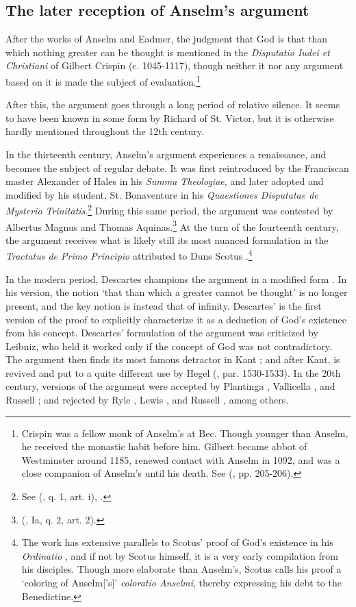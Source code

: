 \documentclass[]{birkjour}
\begin{document}
\subsection{The later reception of Anselm's argument}
After the works of Anselm and Eadmer, the judgment that God is that than which nothing greater can be thought is mentioned in the \textit{Disputatio Iudei et Christiani} of Gilbert Crispin (c. 1045-1117), though neither it nor any argument based on it is made the subject of evaluation.\footnote{Crispin was a fellow monk of Anselm's at Bec. Though younger than Anselm, he received the monastic habit before him. Gilbert became abbot of Westminster around 1185, renewed contact with Anselm in 1092, and was a close companion of Anselm's until his death. See (\cite{Southern1963}, pp. 205-206).}

After this, the argument goes through a long period of relative silence. It seems to have been known in some form by Richard of St. Victor, but it is otherwise hardly mentioned throughout the 12th century.

In the thirteenth century, Anselm's argument experiences a renaissance, and becomes the subject of regular debate. It was first reintroduced by the Franciscan master Alexander of Hales in his \textit{Summa Theologiae}, and later adopted and modified by his student, St. Bonaventure in his \textit{Quaestiones Disputatae de Mysterio Trinitatis}.\footnote{See (\cite{BonaventureTrinity}, q. 1, art. i), \cite{Seifert1992}.} During this same period, the argument was contested by Albertus Magnus and Thomas Aquinas.\footnote{(\cite{AquinasST}, Ia, q. 2, art. 2).} At the turn of the fourteenth century, the argument receives what is likely still its most nuanced formulation in the \textit{Tractatus de Primo Principio}  attributed to Duns Scotus \cite{Scotus1966}.\footnote{The work has extensive parallels to Scotus' proof of God's existence in his \textit{Ordinatio} \cite{ScotusOrd}, and if not by Scotus himself, it is a very early compilation from his disciples. Though more elaborate than Anselm's, Scotus calls his proof a `coloring of Anselm['s]' \textit{coloratio Anselmi}, thereby expressing his debt to the Benedictine.}

In the modern period, Descartes champions the argument in a modified form \cite{Meditations}. In his version, the notion `that than which a greater cannot be thought' is no longer present, and the key notion is instead that of infinity. Descartes' is the first version of the proof to explicitly characterize it as a deduction of God's existence from his concept. Descartes' formulation of the argument was criticized by Leibniz, who held it worked only if the concept of God was not contradictory. The argument then finds its most famous detractor in Kant \cite{KantCritique1}; and after Kant, is revived and put to a quite different use by Hegel (\cite{HegelLogic}, par. 1530-1533). In the 20th century, versions of the argument were accepted by Plantinga \cite{Plantinga1965}, Vallicella \cite{Vallicella2000}, and Russell \cite{RussellAutobio}; and rejected by Ryle \cite{Ryle2009}, Lewis \cite{Lewis1970}, and Russell \cite{RussellAutobio}, among others.
\end{document}
